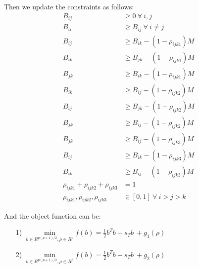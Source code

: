 Then we update the constraints as follows:
\begin{align}
B_{ij} & \ge 0 ~ \forall ~ i, j \\
B_{ii} & \ge B_{ij} ~ \forall ~ i \not= j\\
B_{ij} & \ge B_{ik} - (1 - \rho_{ijk1})M \\
B_{ik} & \ge B_{jk} - (1 - \rho_{ijk1})M \\
B_{jk} & \ge B_{ik} - (1 - \rho_{ijk1})M \\
B_{ik} & \ge B_{ij} - (1 - \rho_{ijk2})M \\
B_{ij} & \ge B_{jk} - (1 - \rho_{ijk2})M \\
B_{jk} & \ge B_{ij} - (1 - \rho_{ijk2})M \\
B_{jk} & \ge B_{ij} - (1 - \rho_{ijk3})M \\
B_{ij} & \ge B_{ik} - (1 - \rho_{ijk3})M \\
B_{ik} & \ge B_{ij} - (1 - \rho_{ijk3})M \\
\rho_{ijk1} + \rho_{ijk2} + \rho_{ijk3} & = 1\\
\rho_{ijk1}, \rho_{ijk2}, \rho_{ijk3} & \in [0, 1] ~ \forall ~i > j > k
\end{align}

And the object function can be:
\begin{itemize}
\item[1)]$\min \limits_{b \in R^{p(p+1)/2}, \rho \in R^{\overline{p}}} f(b) = \frac{1}{2}b^Tb - s_Tb ~+ g_1(\rho)$
\item[2)]$\min \limits_{b \in R^{p(p+1)/2}, \rho \in R^{\overline{p}}} f(b) = \frac{1}{2}b^Tb - s_Tb ~+ g_2(\rho) $
\end{itemize}

